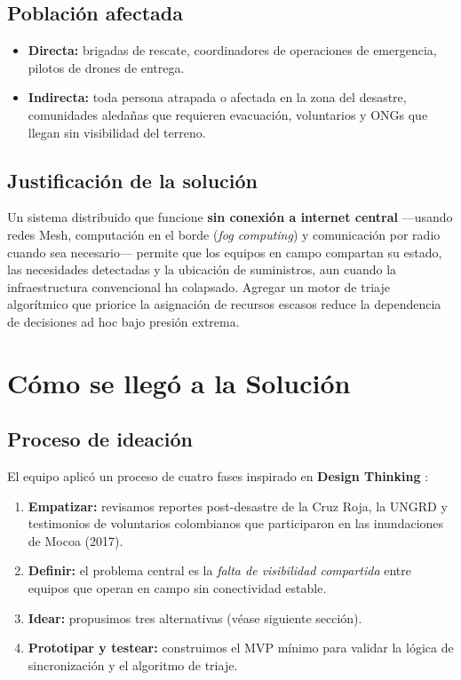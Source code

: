 \documentclass[12pt,a4paper]{article}
\begin{document}
\subsection{Población afectada}

\begin{itemize}[leftmargin=1.5em]
  \item \textbf{Directa:} brigadas de rescate, coordinadores de operaciones de
        emergencia, pilotos de drones de entrega.
  \item \textbf{Indirecta:} toda persona atrapada o afectada en la zona del
        desastre, comunidades aledañas que requieren evacuación, voluntarios y
        ONGs que llegan sin visibilidad del terreno.
\end{itemize}

\subsection{Justificación de la solución}

Un sistema distribuido que funcione \textbf{sin conexión a internet central}
---usando redes Mesh, computación en el borde (\textit{fog computing}) y
comunicación por radio cuando sea necesario--- permite que los equipos en
campo compartan su estado, las necesidades detectadas y la ubicación de
suministros, aun cuando la infraestructura convencional ha colapsado. Agregar
un motor de triaje algorítmico que priorice la asignación de recursos escasos
reduce la dependencia de decisiones ad hoc bajo presión extrema.

\section{Cómo se llegó a la Solución}

\subsection{Proceso de ideación}

El equipo aplicó un proceso de cuatro fases inspirado en \textbf{Design
Thinking} \cite{plattner2010}:

\begin{enumerate}[leftmargin=1.5em]
  \item \textbf{Empatizar:} revisamos reportes post-desastre de la Cruz Roja,
        la UNGRD y testimonios de voluntarios colombianos que participaron en
        las inundaciones de Mocoa (2017).
  \item \textbf{Definir:} el problema central es la \textit{falta de
        visibilidad compartida} entre equipos que operan en campo sin
        conectividad estable.
  \item \textbf{Idear:} propusimos tres alternativas (véase siguiente sección).
  \item \textbf{Prototipar y testear:} construimos el MVP mínimo para validar
        la lógica de sincronización y el algoritmo de triaje.
\end{enumerate}
\end{document}
